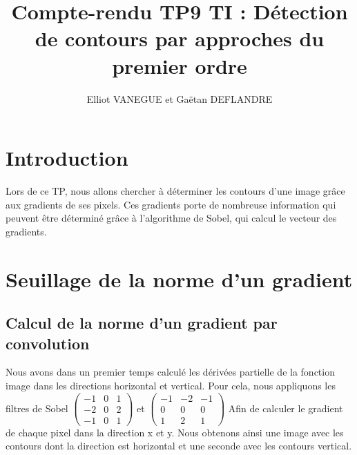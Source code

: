 \documentclass[a4paper,11pt]{article}
\title{Compte-rendu TP9 TI : Détection de contours par approches du premier ordre}
\author{Elliot VANEGUE et Gaëtan DEFLANDRE}
\begin{document}


  \maketitle
  
  \mbox{}
  \newpage
  \clearpage
  
  \section*{Introduction}
  Lors de ce TP, nous allons chercher à déterminer les contours d'une image grâce aux 
  gradients de ses pixels. Ces gradients porte de nombreuse information qui peuvent
  être déterminé grâce à l'algorithme de Sobel, qui calcul le vecteur des gradients.
  
  \section{Seuillage de la norme d'un gradient}
  
  \subsection{Calcul de la norme d'un gradient par convolution}
  Nous avons dans un premier temps calculé les dérivées partielle de la fonction image dans 
  les directions horizontal et vertical. Pour cela, nous appliquons les filtres de Sobel
  $\begin{pmatrix}
     -1 & 0 & 1 \\
     -2 & 0 & 2 \\
     -1 & 0 & 1 
  \end{pmatrix}$ et 
   $\begin{pmatrix}
     -1 & -2 & -1 \\
     0 & 0 & 0 \\
     1 & 2 & 1
  \end{pmatrix}$
  Afin de calculer le gradient de chaque pixel dans la direction x et y.
  Nous obtenons ainsi une image avec les contours dont la direction est horizontal et une seconde avec les contours vertical.\\
  
\end{document}

